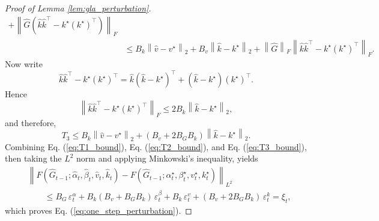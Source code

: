 \documentclass{llmxive}
\providecommand{\norm}[1]{\left\lVert #1 \right\rVert}
\begin{document}
\begin{proof}[Proof of Lemma \ref{lem:gla_perturbation}]
\begin{align}
+
\norm{\hat G(\hat k\hat k^\top-k^\star (k^\star)^\top)}_F
\nonumber\\
&\le
B_k\norm{\hat v-v^\star}_2
+
B_v\norm{\hat k-k^\star}_2
+
\norm{\hat G}_F \norm{\hat k\hat k^\top-k^\star (k^\star)^\top}_F.
\label{eq:T3_three_terms}
\end{align}
Now write
\[
\hat k\hat k^\top-k^\star (k^\star)^\top
=
\hat k(\hat k-k^\star)^\top
+
(\hat k-k^\star)(k^\star)^\top.
\]
Hence
\begin{equation}
\norm{\hat k\hat k^\top-k^\star (k^\star)^\top}_F
\le
2B_k \norm{\hat k-k^\star}_2,
\label{eq:kk_bound}
\end{equation}
and therefore, 
\begin{equation}
T_3
\le
B_k \norm{\hat v-v^\star}_2
+
(B_v+2B_GB_k)\norm{\hat k-k^\star}_2.
\label{eq:T3_bound}
\end{equation}
Combining Eq. (\ref{eq:T1_bound}), Eq. (\ref{eq:T2_bound}), and Eq. (\ref{eq:T3_bound}), then taking the $L^2$ norm and applying Minkowski's inequality, yields
\begin{align}
&\norm{
F(\hat G_{t-1};\hat\alpha_t,\hat\beta_t,\hat v_t,\hat k_t)
-
F(\hat G_{t-1};\alpha_t^\star,\beta_t^\star,v_t^\star,k_t^\star)
}_{L^2}
\nonumber\\
&\qquad\le
B_G\,\varepsilon_t^\alpha
+
B_k(B_v+B_GB_k)\,\varepsilon_t^\beta
+
B_k\,\varepsilon_t^v
+
(B_v+2B_GB_k)\,\varepsilon_t^k
=
\xi_t,
\end{align}
which proves Eq. (\ref{eq:one_step_perturbation}).
\end{proof}
\end{document}
